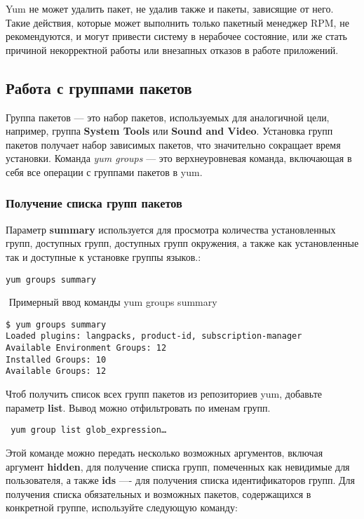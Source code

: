 \documentclass[a4paper,10pt,twoside]{article}
\begin{document}
Yum не может удалить пакет, не удалив также и пакеты, зависящие от него. Такие действия, которые может выполнить только пакетный менеджер RPM, не рекомендуются, и могут привести систему в нерабочее состояние, или же стать причиной некорректной работы или внезапных отказов в работе приложений.

\subsection{Работа с группами пакетов}
Группа пакетов — это набор пакетов, используемых для аналогичной цели, например, группа \textbf{System Tools} или \textbf{Sound and Video}. Установка групп пакетов получает набор зависимых пакетов, что значительно сокращает время установки. Команда \textit{yum groups} — это верхнеуровневая команда, включающая в себя все операции с группами пакетов в yum.

\subsubsection{Получение списка групп пакетов}
Параметр \textbf{summary} используется для просмотра количества установленных групп, доступных групп, доступных групп окружения, а также как установленные так и доступные к установке группы языков.:
\begin{verbatim}
yum groups summary
\end{verbatim} 
⁠
Примерный ввод команды yum groups summary

\begin{verbatim}
$ yum groups summary 
Loaded plugins: langpacks, product-id, subscription-manager
Available Environment Groups: 12
Installed Groups: 10
Available Groups: 12
\end{verbatim} 

Чтоб получить список всех групп пакетов из репозиториев yum, добавьте параметр \textbf{list}. Вывод можно отфильтровать по именам групп.
\begin{verbatim}
 yum group list glob_expression…
\end{verbatim} 


Этой команде можно передать несколько возможных аргументов, включая аргумент \textbf{hidden}, для получение списка групп, помеченных как невидимые для пользователя, а также \textbf{ids} —- для получения списка идентификаторов групп. Для получения списка обязательных и возможных пакетов, содержащихся в конкретной группе, используйте следующую команду:
\end{document}

